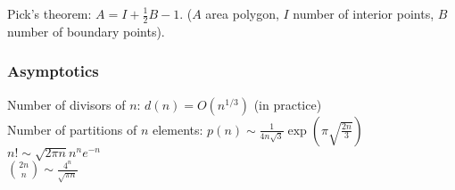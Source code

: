 \documentclass[landscape,a4paper,twocolumn,10pt]{report}
\begin{document}
\noindent Pick's theorem: $A=I+\frac{1}{2}B-1$. ($A$ area polygon, $I$ number of interior points, $B$ number of boundary points).


\subsubsection*{Asymptotics}

\noindent
Number of divisors of $n$: $d(n) = O(n^{1/3})$ (in practice) \\ %
Number of partitions of $n$ elements: $p(n) \sim \frac{1}{4 n \sqrt{3}} \exp(\pi \sqrt{\frac{2n}{3}})$ \\ %
$n! \sim \sqrt{2 \pi n} n^n e^{-n}$ \\ %
$\binom{2n}{n} \sim \frac{4^n}{\sqrt{\pi n}}$

\end{document}
